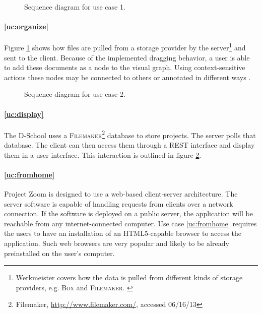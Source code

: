 \begin{figure}
\begin{center}
\caption{Sequence diagram for use case 1.}
\label{fig:evaluc1}
\end{center}
\end{figure}

\paragraph{\ref{uc:organize}} Figure \ref{fig:evaluc1} shows how files are pulled from a storage provider by the server\footnote{Werkmeister covers how the data is pulled from different kinds of storage providers, e.g. \textsc{Box} and \textsc{Filemaker}. \cite{Werkmeister_2013}} and sent to the client. Because of the implemented dragging behavior, a user is able to add these documents as a node to the visual graph. Using context-sensitive actions these nodes may be connected to others or annotated in different ways \cite{Herold_2013}. 

\begin{figure}
\begin{center}
\caption{Sequence diagram for use case 2.}
\label{fig:evaluc2}
\end{center}
\end{figure}

\paragraph{\ref{uc:display}} The D-School uses a \textsc{Filemaker}\footnote{Filemaker, \url{http://www.filemaker.com/}, accessed 06/16/13} database to store projects. The server polls that database. The client can then access them through a REST interface and display them in a user interface. This interaction is outlined in figure \ref{fig:evaluc2}.

\paragraph{\ref{uc:fromhome}} Project Zoom is designed to use a web-based client-server architecture. The server software is capable of handling requests from clients over a network connection. If the software is deployed on a public server, the application will be reachable from any internet-connected computer. Use case \ref{uc:fromhome} requires the users to have an installation of an HTML5-capable browser to access the application. Such web browsers are very popular and likely to be already preinstalled on the user's computer.

